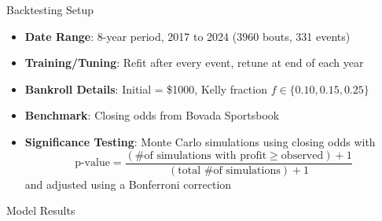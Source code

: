 \documentclass[final]{beamer}
\newlength{\colwidth}
\begin{document}
\begin{frame}[t]
\begin{columns}[t]
\begin{column}{\colwidth}
\begin{block}{Backtesting Setup}
    \begin{itemize}
        \item \textbf{Date Range}: 8-year period, 2017 to 2024 (3960 bouts, 331 events)

        \item \textbf{Training/Tuning}: Refit after every event, retune at end of each year

        \item \textbf{Bankroll Details}: Initial = \$1000, Kelly fraction $f \in \{0.10, 0.15, 0.25\}$

        \item \textbf{Benchmark}: Closing odds from Bovada Sportsbook

        \item \textbf{Significance Testing}: Monte Carlo simulations using closing odds with
        $$\text{p-value} = \frac{(\text{\# of simulations with profit}\geq\text{observed}) + 1}{(\text{total \# of simulations}) + 1}$$
        and adjusted using a Bonferroni correction
    \end{itemize}

  \end{block}
  \vspace{-20pt}
  \begin{block}{Model Results}


\end{block}
\end{column}
\end{columns}
\end{frame}
\end{document}
